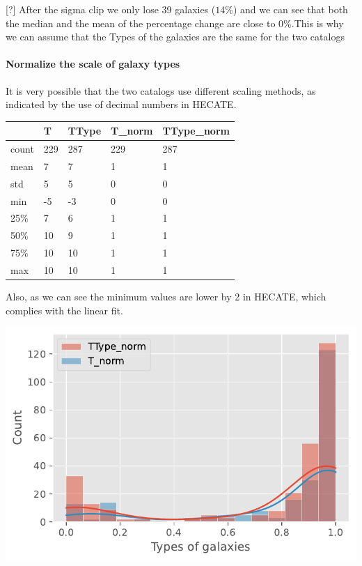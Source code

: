 \documentclass[
]{article}
\let\oldparagraph\paragraph
\renewcommand{\paragraph}[1]{\oldparagraph{#1}\mbox{}}
\begin{document}
{[}?{]} After the sigma clip we only lose 39 galaxies (\(14\%\)) and we
can see that both the median and the mean of the percentage change are
close to \(0\%\).This is why we can assume that the Types of the
galaxies are the same for the two catalogs

\paragraph{Normalize the scale of galaxy
types}\label{normalize-the-scale-of-galaxy-types}

It is very possible that the two catalogs use different scaling methods,
as indicated by the use of decimal numbers in HECATE.

\begin{longtable}[]{@{}lllll@{}}
\toprule\noalign{}
& T & TType & T\_norm & TType\_norm \\
\midrule\noalign{}
\endhead
\bottomrule\noalign{}
\endlastfoot
count & 229 & 287 & 229 & 287 \\
mean & 7 & 7 & 1 & 1 \\
std & 5 & 5 & 0 & 0 \\
min & -5 & -3 & 0 & 0 \\
25\% & 7 & 6 & 1 & 1 \\
50\% & 10 & 9 & 1 & 1 \\
75\% & 10 & 10 & 1 & 1 \\
max & 10 & 10 & 1 & 1 \\
\end{longtable}

Also, as we can see the minimum values are lower by 2 in HECATE, which
complies with the linear fit.

\includegraphics{compare_files/figure-pdf/cell-27-output-1.pdf}
\end{document}
